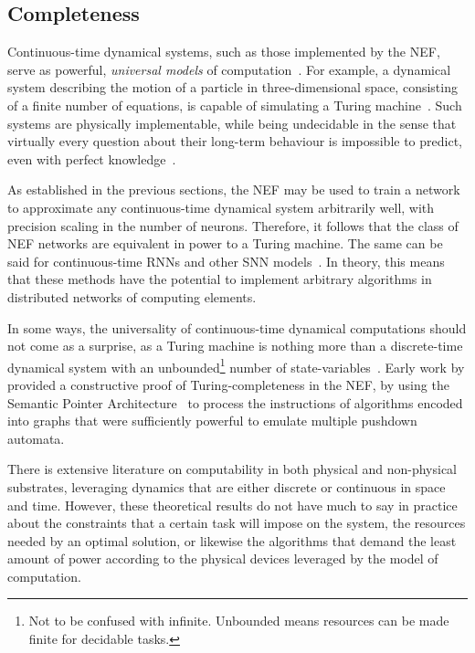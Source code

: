 \subsection{Completeness}
\label{sec:nef-turing}

Continuous-time dynamical systems, such as those implemented by the NEF, serve as powerful, \emph{universal models} of computation~\citep{bennett1995universal}.
For example, a dynamical system describing the motion of a particle in three-dimensional space, consisting of a finite number of equations, is capable of simulating a Turing machine~\citep{moore1990unpredictability}.
Such systems are physically implementable, while being undecidable in the sense that virtually every question about their long-term behaviour is impossible to predict, even with perfect knowledge~\citep[][]{moore1991generalized}.

As established in the previous sections, the NEF may be used to train a network to approximate any continuous-time dynamical system arbitrarily well, with precision scaling in the number of neurons.
Therefore, it follows that the class of NEF networks are equivalent in power to a Turing machine.
The same can be said for continuous-time RNNs and other SNN models~\citep{funahashi1993approximation, thalmeier2016learning}.
In theory, this means that these methods have the potential to implement arbitrary algorithms in distributed networks of computing elements.

In some ways, the universality of continuous-time dynamical computations should not come as a surprise, as 
a Turing machine is nothing more than a discrete-time dynamical system with an unbounded\footnote{%
Not to be confused with infinite. Unbounded means resources can be made finite for decidable tasks.}
number of state-variables~\citep{turing1938computable}.
Early work by \citet{voelker2014controlling} provided a constructive proof of Turing-completeness in the NEF, by using the Semantic Pointer Architecture~\citep[SPA;][]{eliasmith2013build} to process the instructions of algorithms encoded into graphs that were sufficiently powerful to emulate multiple pushdown automata.

There is extensive literature on computability in both physical and non-physical substrates, leveraging dynamics that are either discrete or continuous in space and time.
However, these theoretical results do not have much to say in practice about the constraints that a certain task will impose on the system, the resources needed by an optimal solution, or likewise the algorithms that demand the least amount of power according to the physical devices leveraged by the model of computation.

